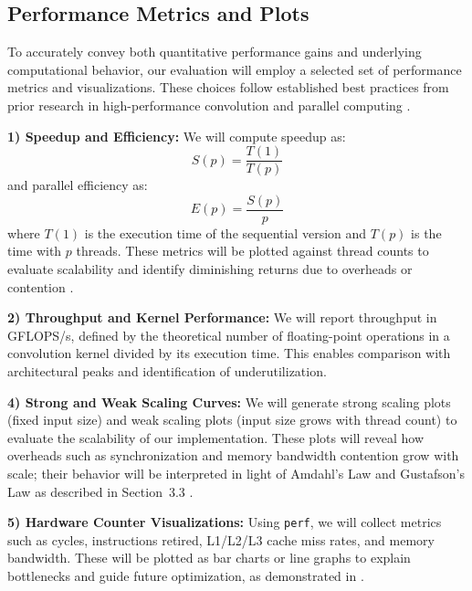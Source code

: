\documentclass[conference, 10pt]{IEEEtran}
\begin{document}
\subsection{Performance Metrics and Plots}

To accurately convey both quantitative performance gains and underlying computational behavior, our evaluation will employ a selected set of performance metrics and visualizations. These choices follow established best practices from prior research in high-performance convolution and parallel computing \cite{Wang2023,  hager2021hpc, Rajput2013, Yoon2012}.

\vspace{0.5em}
\textbf{1) Speedup and Efficiency:} 
We will compute speedup as:
\begin{equation}
    S(p) = \frac{T(1)}{T(p)}
\end{equation}
and parallel efficiency as:
\begin{equation}
    E(p) = \frac{S(p)}{p}
\end{equation}
where \(T(1)\) is the execution time of the sequential version and \(T(p)\) is the time with \(p\) threads. These metrics will be plotted against thread counts to evaluate scalability and identify diminishing returns due to overheads or contention \cite{Rajput2013}.

\vspace{0.5em}
\textbf{2) Throughput and Kernel Performance:} 
We will report throughput in GFLOPS/s, defined by the theoretical number of floating-point operations in a convolution kernel divided by its execution time. This enables comparison with architectural peaks and identification of underutilization.

\textbf{4) Strong and Weak Scaling Curves:} 
We will generate strong scaling plots (fixed input size) and weak scaling plots (input size grows with thread count) to evaluate the scalability of our implementation. These plots will reveal how overheads such as synchronization and memory bandwidth contention grow with scale; their behavior will be interpreted in light of Amdahl’s Law and Gustafson’s Law as described in Section~3.3 \cite{hager2021hpc, Gustafson1988}.

\vspace{0.5em}
\textbf{5) Hardware Counter Visualizations:} 
Using \texttt{perf}, we will collect metrics such as cycles, instructions retired, L1/L2/L3 cache miss rates, and memory bandwidth. These will be plotted as bar charts or line graphs to explain bottlenecks and guide future optimization, as demonstrated in \cite{Yoon2012}.
\end{document}

